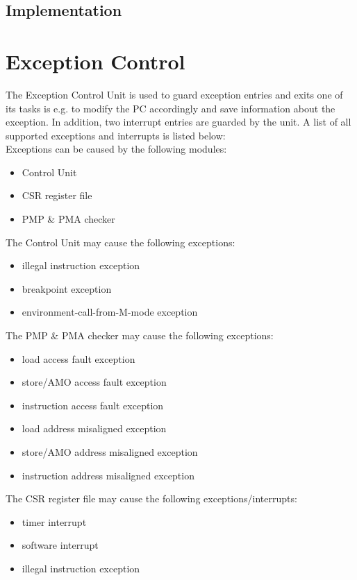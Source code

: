 \subsection{Implementation}

\section{Exception Control}
The Exception Control Unit is used to guard exception entries and exits one of its
tasks is e.g. to modify the PC accordingly and save information about the exception.
In addition, two interrupt entries are guarded by the unit. A list of all supported
exceptions and interrupts is listed below:\\
Exceptions can be caused by the following modules:
\begin{itemize}
	\item Control Unit
	\item CSR register file
	\item PMP \& PMA checker
\end{itemize}

The Control Unit may cause the following exceptions:
\begin{itemize}
	\item illegal instruction exception
	\item breakpoint exception
	\item environment-call-from-M-mode exception
\end{itemize}

The PMP \& PMA checker may cause the following exceptions:
\begin{itemize}
	\item load access fault exception
	\item store/AMO access fault exception
	\item instruction access fault exception
	\item load address misaligned exception
	\item store/AMO address misaligned exception
	\item instruction address misaligned exception
\end{itemize}

The CSR register file may cause the following exceptions/interrupts:
\begin{itemize}
	\item timer interrupt
	\item software interrupt
	\item illegal instruction exception
\end{itemize}
